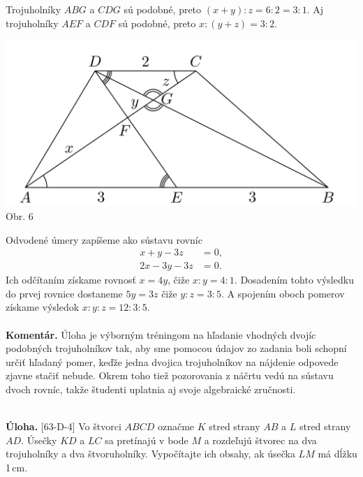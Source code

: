 \documentclass[11pt,a4paper,oneside,final]{book}
\newcommand{\kom}{\textbf{Komentár.} }
\newcommand{\ul}{\textbf{Úloha.} }
\begin{document}
Trojuholníky $ABG$ a $CDG$ sú podobné, preto $(x + y) : z = 6 : 2 = 3 : 1$. Aj trojuholníky $AEF$ a $CDF$ sú podobné, preto $x : (y + z) = 3 : 2$.
\begin{center}
\includegraphics{64D4}\\
Obr. 6
\end{center}
Odvodené úmery zapíšeme ako sústavu rovníc
\begin{align*}
x + y - 3z &= 0,\\
2x - 3y - 3z &= 0.
\end{align*}
Ich odčítaním získame rovnosť $x = 4y$, čiže $x : y = 4 : 1$. Dosadením tohto výsledku do prvej rovnice dostaneme $5y = 3z$ čiže $y : z = 3 : 5$. A spojením oboch pomerov získame výsledok $x : y : z = 12 : 3 : 5$.\\
\\
\kom Úloha je výborným tréningom na hľadanie vhodných dvojíc podobných trojuholníkov tak, aby sme pomocou údajov zo zadania boli schopní určiť hľadaný pomer, keďže jedna dvojica trojuholníkov na nájdenie odpovede zjavne stačiť nebude. Okrem toho tiež pozorovania z náčrtu vedú na sústavu dvoch rovníc, takže študenti uplatnia aj svoje algebraické zručnosti.\\
\\
\begin{tcolorbox}[breakable,notitle,boxrule=0pt,colback=light-gray,colframe=light-gray]\ul [63-D-4] Vo štvorci $ABCD$ označme $K$ stred strany $AB$ a $L$ stred strany $AD$. Úsečky $KD$ a $LC$ sa pretínajú v bode $M$ a rozdeľujú štvorec na dva trojuholníky a dva štvoruholníky. Vypočítajte ich obsahy, ak úsečka $LM$ má dĺžku 1\,cm.

\end{tcolorbox}
\end{document}
